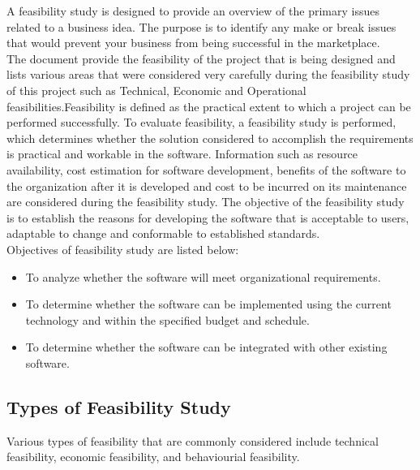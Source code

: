 A feasibility study is designed to provide an overview of the primary issues related to a business idea. The purpose is to identify any make or break issues that would prevent your business from being successful in the marketplace.\\%

The document provide the feasibility of the project that is being designed and lists various areas that were considered very carefully during the feasibility study of this project such as Technical, Economic and Operational feasibilities.Feasibility is defined as the practical extent to which a project can be performed successfully. To evaluate feasibility, a feasibility study is performed, which determines whether the solution considered to accomplish the requirements is practical and workable in the software. Information such as resource availability, cost estimation for software development, benefits of the software to the organization after it is developed and cost to be incurred on its maintenance are considered during the feasibility study. The objective of the feasibility study is to establish the reasons for developing the software that is acceptable to users, adaptable to change and conformable to established standards.\\
Objectives of feasibility study are listed below:
\begin{itemize}
	\item To analyze whether the software will meet organizational requirements.
	\item To determine whether the software can be implemented using the current technology and within the specified budget and schedule.
	\item To determine whether the software can be integrated with other existing software.
\end{itemize}

\subsection{Types of Feasibility Study}
Various types of feasibility that are commonly considered include technical feasibility, economic feasibility, and behaviourial feasibility.

